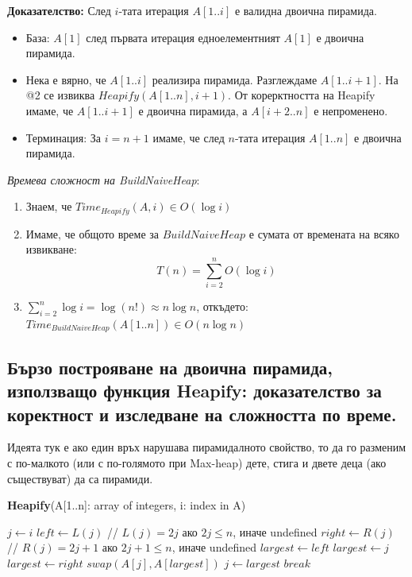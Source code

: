 \documentclass{article}
\renewcommand{\\}{\newline}
\newcommand{\doc}{\textbf{Доказателство: }}
\begin{document}
  \doc След \(i\)-тата итерация \(A[1..i]\) е валидна двоична пирамида.

  \begin{itemize}
    \item База: \(A[1]\) след първата итерация едноелементният \(A[1]\) е двоична пирамида.   
    \item Нека е вярно, че \(A[1..i]\) реализира пирамида. Разглеждаме \(A[1..i+1]\). На @2 се извиква \(Heapify(A[1..n], i+1)\). От корерктността на Heapify имаме, че \(A[1..i+1]\) е двоична пирамида, а \(A[i+2..n]\) е непроменено.    
    \item Терминация: За \(i = n + 1\) имаме, че след \(n\)-тата итерация \(A[1..n]\) е двоична пирамида.  
  \end{itemize}

  \textit{Времева сложност на BuildNaiveHeap}: 
  \begin{enumerate}
      \item Знаем, че \(Time_{Heapify}(A, i) \in O(\log i)\)  
      \item Имаме, че общото време за \(BuildNaiveHeap\) е сумата от времената на всяко извикване: \[
        T(n) = \sum_{i=2}^{n}O(\log i)
      \]  
    \item \(\sum_{i=2}^{n}\log i = \log (n!) \approx n \log n\), откъдето: \(Time_{BuildNaiveHeap}(A[1..n]) \in O(n\log n)\)   
  \end{enumerate}

\subsection{Бързо построяване на двоична пирамида, използващо функция Heapify: доказателство за коректност и изследване на сложността по време. }

Идеята тук е ако един връх нарушава пирамидалното свойство, то да го разменим с по-малкото (или с по-голямото при Max-heap) дете, стига и двете деца (ако съществуват) да са пирамиди.

\textbf{Heapify}(A[1..n]: array of integers, i: index in A) 
\begin{algorithmic}[1]
    \State \(j \gets i\)  
      \State \(left \gets L(j)\) // \(L(j) = 2j\) ако \(2j \leq n\), иначе undefined    
      \State \(right \gets R(j)\) // \(R(j) = 2j+1\) ако \(2j+1 \leq n\), иначе undefined    
        \State \(largest \gets left\)
      \Else
        \State \(largest \gets j\)  
      \EndIf
        \State \(largest \gets right\) 
      \EndIf
        \State \(swap(A[j], A[largest])\)   
        \State \(j \gets largest\)
      \Else
        \State \(break\)
      \EndIf
    \EndWhile
\end{algorithmic} 
\end{document}
